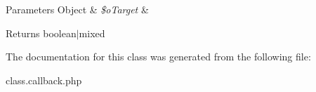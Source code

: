 \begin{DoxyParams}[1]{Parameters}
Object & {\em \$o\-Target} & \\
\hline
\end{DoxyParams}
\begin{DoxyReturn}{Returns}
boolean$|$mixed 
\end{DoxyReturn}


The documentation for this class was generated from the following file\-:\begin{DoxyCompactItemize}
\item 
class.\-callback.\-php\end{DoxyCompactItemize}

